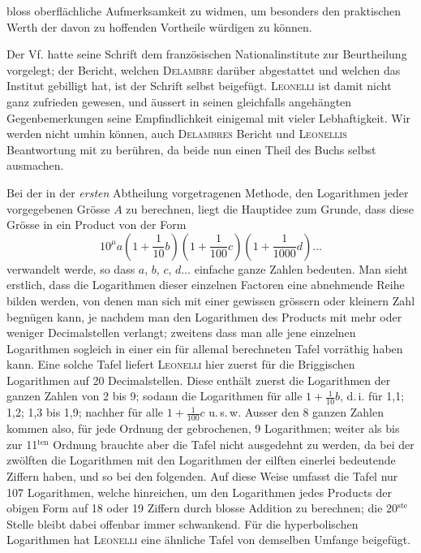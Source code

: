 bloss oberflächliche Aufmerksamkeit zu widmen, um besonders den praktischen Werth der davon zu hoffenden Vortheile würdigen zu können.

Der Vf. hatte seine Schrift dem französischen Nationalinstitute zur Beurtheilung vorgelegt; der Bericht, welchen \textsc{Delambre} darüber abgestattet und welchen das Institut gebilligt hat, ist der Schrift selbst beigefügt. \textsc{Leonelli} ist damit nicht ganz zufrieden gewesen, und äussert in seinen gleichfalls angehängten Gegenbemerkungen seine Empfindlichkeit einigemal mit vieler Lebhaftigkeit. Wir werden nicht umhin können, auch \textsc{Delambres} Bericht und \textsc{Leonellis} Beantwortung mit zu berühren, da beide nun einen Theil des Buchs selbst ausmachen.

Bei der in der \emph{ersten} Abtheilung vorgetragenen Methode, den Logarithmen jeder vorgegebenen Grösse $A$ zu berechnen, liegt die Hauptidee zum Grunde, dass diese Grösse in ein Product von der Form
\[
10^{\mu} a \left(1+\frac{1}{10} b\right)\left(1+\frac{1}{100} c\right)\left(1+\frac{1}{1000} d\right)\ldots
\]
verwandelt werde, so dass $a$, $b$, $c$, $d\ldots$ einfache ganze Zahlen bedeuten. Man sieht erstlich, dass die Logarithmen dieser einzelnen Factoren eine abnehmende Reihe bilden werden, von denen man sich mit einer gewissen grössern oder kleinern Zahl begnügen kann, je nachdem man den Logarithmen des Products mit mehr oder weniger Decimalstellen verlangt; zweitens dass man alle jene einzelnen Logarithmen sogleich in einer ein für allemal berechneten Tafel vorräthig haben kann. Eine solche Tafel liefert \textsc{Leonelli} hier zuerst für die Briggischen Logarithmen auf 20 Decimalstellen. Diese enthält zuerst die Logarithmen der ganzen Zahlen von 2 bis 9; sodann die Logarithmen für alle $1+\frac{1}{10} b$, d.\,i. für 1,1; 1,2; 1,3 bis 1,9; nachher für alle $1+\frac{1}{100} c$ u.\,s.\,w. Ausser den 8 ganzen Zahlen kommen also, für jede Ordnung der gebrochenen, 9 Logarithmen; weiter als bis zur 11$^{\mathrm{ten}}$ Ordnung brauchte aber die Tafel nicht ausgedehnt zu werden, da bei der zwölften die Logarithmen mit den Logarithmen der eilften einerlei bedeutende Ziffern haben, und so bei den folgenden. Auf diese Weise umfasst die Tafel nur 107 Logarithmen, welche hinreichen, um den Logarithmen jedes Products der obigen Form auf 18 oder 19 Ziffern durch blosse Addition zu berechnen; die 20$^{\mathrm{ste}}$ Stelle bleibt dabei offenbar immer schwankend. Für die hyperbolischen Logarithmen hat \textsc{Leonelli} eine ähnliche Tafel von demselben Umfange beigefügt.

